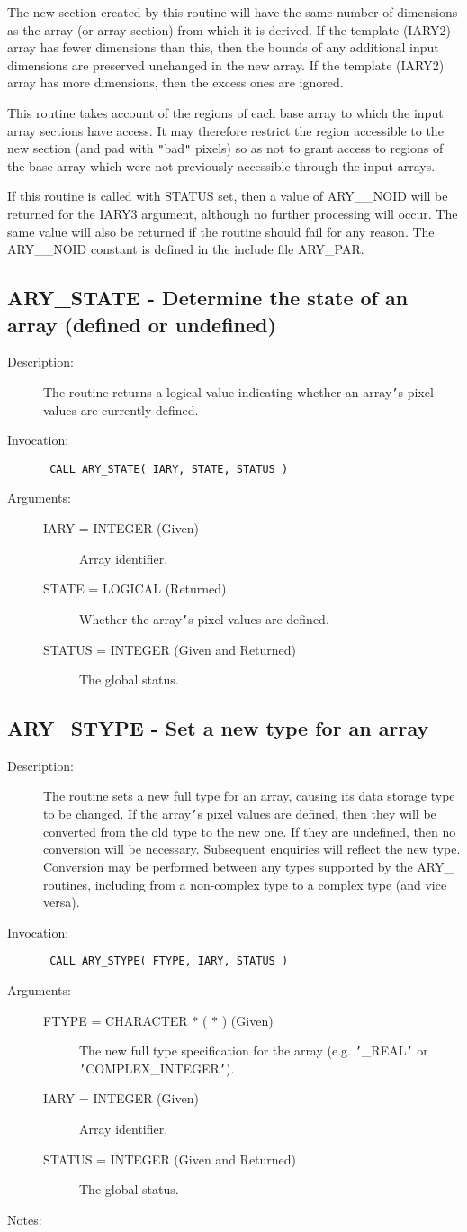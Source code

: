 \documentclass[twoside,11pt]{article}
\newcommand{\xlabel}[1]{}
\newlength{\sstbannerlength}
\newlength{\sstcaptionlength}
\newlength{\sstexampleslength}
\newlength{\sstexampleswidth}
\newcommand{\sstroutine}[3]{
   \goodbreak
   \rule{\textwidth}{0.5mm}
   \vspace{-7ex}
   \newline
   \settowidth{\sstbannerlength}{{\Large {\bf #1}}}
   \setlength{\sstcaptionlength}{\textwidth}
   \setlength{\sstexampleslength}{\textwidth}
   \addtolength{\sstbannerlength}{0.5em}
   \addtolength{\sstcaptionlength}{-2.0\sstbannerlength}
   \addtolength{\sstcaptionlength}{-5.0pt}
   \settowidth{\sstexampleswidth}{{\bf Examples:}}
   \addtolength{\sstexampleslength}{-\sstexampleswidth}
   \parbox[t]{\sstbannerlength}{\flushleft{\Large {\bf #1}}}
   \parbox[t]{\sstcaptionlength}{\center{\Large #2}}
   \parbox[t]{\sstbannerlength}{\flushright{\Large {\bf #1}}}
   \begin{description}
      #3
   \end{description}
}
\newcommand{\sstdescription}[1]{\item[Description:] #1}
\newcommand{\sstinvocation}[1]{\item[Invocation:]\hspace{0.4em}{\tt #1}}
\newcommand{\sstarguments}[1]{
   \item[Arguments:] \mbox{} \\
   \vspace{-3.5ex}
   \begin{description}
      #1
   \end{description}
}
\newcommand{\sstsubsection}[1]{ \item[{#1}] \mbox{} \\}
\newcommand{\sstnotes}[1]{\item[Notes:] \mbox{} \\[1.3ex] #1}
\newcommand{\sstitemlist}[1]{
  \mbox{} \\
  \vspace{-3.5ex}
  \begin{itemize}
     #1
  \end{itemize}
}
\newcommand{\sstitem}{\item}
\newcommand{\ssttt}{\tt}
\renewcommand{\sstroutine}[3]{
      \subsection{#1\xlabel{#1}-\label{#1}#2}
      \begin{description}
         #3
      \end{description}
   }
\renewcommand{\sstdescription}[1]{\item[Description:]
      \begin{description}
         #1
      \end{description}
   }
\renewcommand{\sstinvocation}[1]{\item[Invocation:]
      \begin{description}
         {\ssttt #1}
      \end{description}
   }
\renewcommand{\sstarguments}[1]{
      \item[Arguments:]
      \begin{description}
         #1
      \end{description}
   }
\renewcommand{\sstsubsection}[1]{\item[{#1}]}
\renewcommand{\sstnotes}[1]{\item[Notes:]
      \begin{description}
         #1
      \end{description}
   }
\newcommand{\sstitemlist}[1]{
      \begin{itemize}
         #1
      \end{itemize}
   }
\begin{document}
\begin{eqn*}
{{{         \sstitem
         The new section created by this routine will have the same
         number of dimensions as the array (or array section) from which
         it is derived. If the template (IARY2) array has fewer dimensions
         than this, then the bounds of any additional input dimensions are
         preserved unchanged in the new array. If the template (IARY2)
         array has more dimensions, then the excess ones are ignored.

         \sstitem
         This routine takes account of the regions of each base array
         to which the input array sections have access. It may therefore
         restrict the region accessible to the new section (and pad with
         {\tt "}bad{\tt "} pixels) so as not to grant access to regions of the base
         array which were not previously accessible through the input
         arrays.

         \sstitem
         If this routine is called with STATUS set, then a value of
         ARY\_\_NOID will be returned for the IARY3 argument, although no
         further processing will occur. The same value will also be
         returned if the routine should fail for any reason. The ARY\_\_NOID
         constant is defined in the include file ARY\_PAR.
      }
   }
}
\sstroutine{
   ARY\_STATE
}{
   Determine the state of an array (defined or undefined)
}{
   \sstdescription{
      The routine returns a logical value indicating whether an array{\tt '}s
      pixel values are currently defined.
   }
   \sstinvocation{
      CALL ARY\_STATE( IARY, STATE, STATUS )
   }
   \sstarguments{
      \sstsubsection{
         IARY = INTEGER (Given)
      }{
         Array identifier.
      }
      \sstsubsection{
         STATE = LOGICAL (Returned)
      }{
         Whether the array{\tt '}s pixel values are defined.
      }
      \sstsubsection{
         STATUS = INTEGER (Given and Returned)
      }{
         The global status.
      }
   }
}
\sstroutine{
   ARY\_STYPE
}{
   Set a new type for an array
}{
   \sstdescription{
      The routine sets a new full type for an array, causing its data
      storage type to be changed. If the array{\tt '}s pixel values are
      defined, then they will be converted from the old type to the new
      one.  If they are undefined, then no conversion will be
      necessary.  Subsequent enquiries will reflect the new type.
      Conversion may be performed between any types supported by the
      ARY\_ routines, including from a non-complex type to a complex
      type (and vice versa).
   }
   \sstinvocation{
      CALL ARY\_STYPE( FTYPE, IARY, STATUS )
   }
   \sstarguments{
      \sstsubsection{
         FTYPE = CHARACTER $*$ ( $*$ ) (Given)
      }{
         The new full type specification for the array (e.g.  {\tt '}\_REAL{\tt '}
         or {\tt '}COMPLEX\_INTEGER{\tt '}).
      }
      \sstsubsection{
         IARY = INTEGER (Given)
      }{
         Array identifier.
      }
      \sstsubsection{
         STATUS = INTEGER (Given and Returned)
      }{
         The global status.
      }
   }
   \sstnotes{
      \sstitemlist{

}}}
\end{eqn*}
\end{document}
